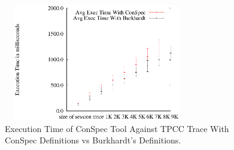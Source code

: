 \documentclass[conference]{IEEEtran}
\begin{document}
	\begin{figure}%
		\includegraphics[width=3.2in,height=2in]
		{conspecTPCCvarhist.eps} %
		\caption{Execution Time of ConSpec Tool Against TPCC Trace With ConSpec Definitions vs Burkhardt's Definitions.}
		\label{fig:examplefulltpcc}
	\end{figure}
\end{document}
